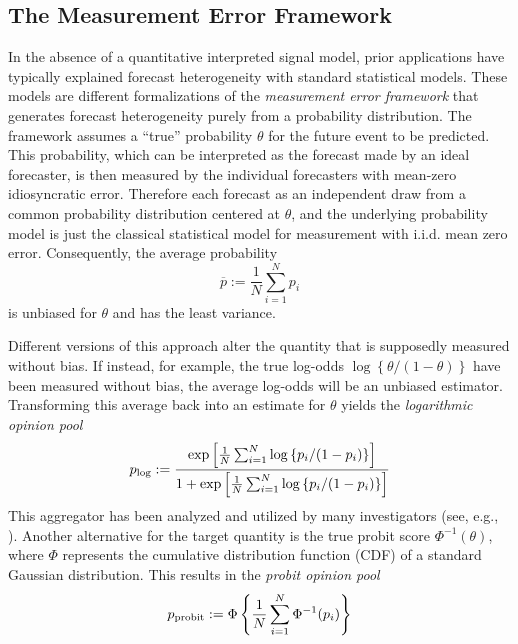 \documentclass[11pt]{article}
\theoremstyle{definition}
\theoremstyle{definition}
\def\pb{\overline{p}}
\def\probit{p_{\rm probit}}
\def\plog{p_{\rm log}}
\begin{document}
%

\subsection{The Measurement Error Framework}
\label{ss:measurement}
In the absence of a quantitative
interpreted signal model, prior applications have typically explained forecast heterogeneity  with standard statistical models. These models are different formalizations of  the \textit{measurement error framework} that generates forecast heterogeneity purely from a probability distribution. The framework assumes a ``true'' probability
$\theta$  for the future event to be predicted. This probability, which can be interpreted as the  forecast made by an ideal forecaster, is then measured by the individual forecasters with mean-zero idiosyncratic error.  Therefore each forecast as an independent draw from a common
probability distribution centered at $\theta$, and the underlying probability model is just the 
classical statistical model for measurement with i.i.d. mean zero error. 
Consequently, the average probability
$$\pb := \frac{1}{N}\sum_{i=1}^N
p_i$$
is unbiased for $\theta$ and has the least
variance.

Different versions of this approach alter the quantity that is supposedly
measured without bias. If instead, for example, the true log-odds
$\log\left\{\theta/(1-\theta)\right\}$ have been measured without
bias, the average log-odds will be an unbiased estimator. Transforming
this average back into an estimate for $\theta$ yields the {\em
logarithmic opinion pool}
$$\plog := \frac{\exp \left [ \frac{1}{N} \sum_{i=1}^N
   \log \left\{ p_i / (1-p_i) \right\} \right ]} {1 + \exp \left [
\frac{1}{N} \sum_{i=1}^N \log \left\{p_i / (1-p_i)\right\} \right
]} $$ This aggregator has been analyzed and utilized by many
investigators (see, e.g., \citealt{dawid1995coherent, Genest,
bacharach1975group}). Another alternative for the target quantity is
the true probit score $\Phi^{-1}(\theta)$, where $\Phi$ represents the
cumulative distribution function (CDF) of a standard Gaussian
distribution. This results in the {\em probit opinion pool}
$$\probit := \Phi \left\{ \frac{1}{N} \sum_{i=1}^N \Phi^{-1}
   (p_i) \right \} $$
\end{document}
